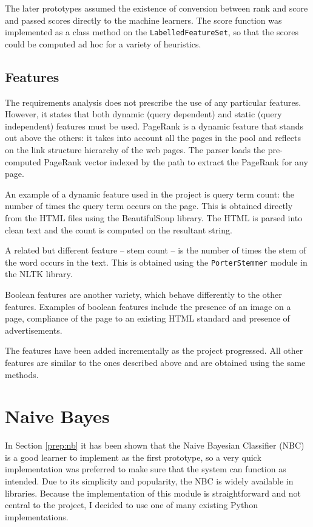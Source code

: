\documentclass[12pt,notitlepage,twoside]{scrreprt}
\begin{document}
The later prototypes assumed the existence of conversion between rank and score and passed
scores directly to the machine learners. The score function was implemented as a class method on the
\texttt{LabelledFeatureSet}, so that the scores could be computed ad hoc for a variety of
heuristics.

\subsection{Features}


The requirements analysis does not prescribe the use of any particular
features. However, it states that both dynamic (query dependent) and
static (query independent) features must be used. PageRank is a dynamic feature
that stands out above the others: it takes into account all the pages
in the pool and reflects on the link structure hierarchy of the web pages. 
The parser loads the pre-computed PageRank vector indexed by the path to
extract the PageRank for any page.

An example of a dynamic feature used in the project is query term count: the
number of times the query term occurs on the page. This is obtained directly
from the HTML files using the BeautifulSoup library.
The HTML is parsed into clean text and the count is
computed on the resultant string.

A related but different feature -- stem count -- is the number of times the
stem of the word occurs in the text. This is obtained using the \texttt{PorterStemmer}
module in the NLTK library.

Boolean features are another variety, which  behave differently to the other
features. Examples of boolean features include the presence of an image on a page, compliance
of the page to an existing HTML standard and presence of advertisements.

The features have been added incrementally as the project progressed. All other
features are similar to the ones described above and are obtained using the
same methods. 

\section{Naive Bayes}
In Section \ref{prep:nb} it has been shown that the Naive Bayesian Classifier (NBC) is a good learner
to implement as the first prototype, so a very quick implementation was
preferred to make sure that the system can function as intended. Due to
its simplicity and popularity, the NBC is widely available in 
libraries. Because the implementation of this module is straightforward and not
central to the project, I decided to use one of many existing Python
implementations. 
\end{document}
